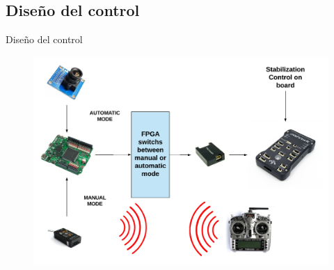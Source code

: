 \documentclass{beamer}
\begin{document}
\subsection{Diseño del control}
\begin{frame}{Diseño del control}
\begin{figure}[H]
	\center
	\includegraphics[trim = 0mm 0cm 0mm 0cm, clip,scale=0.39]{imagenes/Cuadricoptero_vision/control_implementation.pdf}
\end{figure}
\end{frame}
\end{document}
